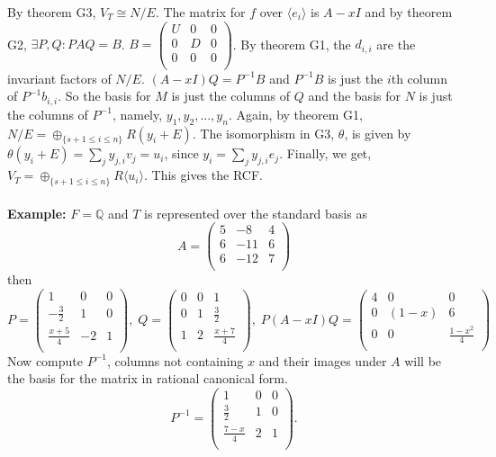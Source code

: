 By theorem G3, $V_T \cong N/E$.  The matrix for $f$ over $\langle e_i \rangle$ 
is $A-xI$ and by theorem G2, $\exists P, Q: PAQ=B$.
$B= 
\left(
\begin{array}{ccc}
U & 0 & 0\\
0 & D & 0\\
0 & 0 & 0\\
\end{array}
\right) $.  By theorem G1, the $d_{i,i}$ are the invariant factors of $N/E$.  $(A-xI)Q = P^{-1}B$ and
$P^{-1}B$ is just the $i$th column of $P^{-1} b_{i,i}$.
So the basis for $M$ is just the columns of $Q$ and the basis for $N$ is just the columns of $P^{-1}$, namely,
$y_1, y_2 , \ldots , y_n$.  Again, by theorem G1, $N/E = \oplus_{\{s+1 \leq i \leq n\}} R(y_i + E)$.
The isomorphism in G3, $\theta$, is given by $\theta(y_i + E) = \sum_j y_{j,i}v_j = u_i$, since
$y_i = \sum_j y_{j,i}e_j$.  Finally, we get,
$V_T= \oplus_{\{s+1 \leq i \leq n\}} R\langle u_i \rangle$.  This gives the RCF.
\\
\\
{\bf Example:} $F = \mathbb{Q}$ and $T$ is represented over the standard basis as
$$
A =
\left(
\begin{array}{ccc}
5 & -8 & 4\\
6 & -11& 6\\
6 & -12& 7\\
\end{array}
\right)
$$
then
$$
P =
\left(
\begin{array}{ccc}
1 & 0 & 0\\
-{\frac 3 2} & 1 & 0\\
{\frac {x+5} 4} & -2& 1\\
\end{array}
\right),\;
Q =
\left(
\begin{array}{ccc}
0 & 0 & 1\\
0 & 1& {\frac 3 2}\\
1 & 2& {\frac {x+7} 4}\\
\end{array}
\right),\;
P(A-xI)Q =
\left(
\begin{array}{ccc}
4 & 0 & 0\\
0 & (1-x) & 6\\
0 & 0& {\frac {1-x^2} 4} \\
\end{array}
\right)
$$
Now compute $P^{-1}$, columns not containing $x$ and their images under $A$ will be the basis for the matrix in rational canonical form.
$$
P^{-1} =
\left(
\begin{array}{ccc}
1 & 0 & 0\\
{\frac 3 2} & 1 & 0\\
{\frac {7-x} 4}  & 2& 1\\
\end{array}
\right).
$$
